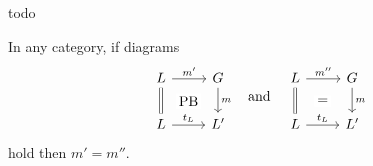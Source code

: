 \documentclass{book}
\begin{document}
\begin{example}
  todo
\end{example}

    \begin{proposition}
      In any category, if diagrams
    \[
    \begin{tikzcd}
    L \arrow[r, "m'"] \arrow[d, equals] & G \arrow[d, "m"] \\
    L \arrow[r, "t_L"] & L'
    \arrow[phantom, from=1-1, to=2-2, "\mathrm{PB}" description]
    \end{tikzcd}
    \quad \text{and} \quad
    \begin{tikzcd}
    L \arrow[r, "m''"] \arrow[d, equals] & G \arrow[d, "m"] \\
    L \arrow[r, "t_L"] & L'
    \arrow[phantom, from=1-1, to=2-2, "\mathrm{=}" description]
    \end{tikzcd}
    \]
    hold then $m' = m''$.
    \end{proposition}
    
\end{document}
